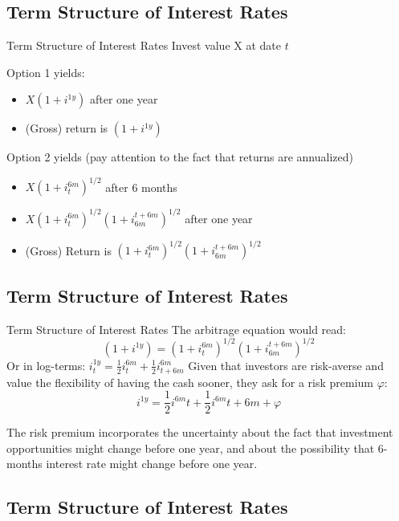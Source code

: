 \documentclass[
  ignorenonframetext,
  aspectratio=169,
]{beamer}
\providecommand{\tightlist}{%
  \setlength{\itemsep}{0pt}\setlength{\parskip}{0pt}}\usepackage{longtable,booktabs,array}
\begin{document}
\subsection{Term Structure of Interest
Rates}\label{term-structure-of-interest-rates}

\begin{frame}{Term Structure of Interest Rates}
Invest value X at date \(t\)

Option 1 yields:

\begin{itemize}
\tightlist
\item
  \(X(1+i^{1y})\) after one year
\item
  (Gross) return is \((1+i^{1y})\)
\end{itemize}

Option 2 yields (pay attention to the fact that returns are annualized)

\begin{itemize}
\tightlist
\item
  \(X(1+i^{6m}_t)^{1/2}\) after 6 months
\item
  \(X(1+i^{6m}_t)^{1/2}(1+i^{t+6m}_{6m})^{1/2}\) after one year
\item
  (Gross) Return is \((1+i^{6m}_t)^{1/2}(1+i^{t+6m}_{6m})^{1/2}\)
\end{itemize}
\end{frame}

\subsection{Term Structure of Interest
Rates}\label{term-structure-of-interest-rates-1}

\begin{frame}{Term Structure of Interest Rates}
The arbitrage equation would read:
\[(1+i^{1y}) = (1+i^{6m}_t)^{1/2}(1+i^{t+6m}_{6m})^{1/2}\] Or in
log-terms:
\(i^{1y}_t = \frac{1}{2} i^ {6m}_t + \frac{1}{2} i^ {6m}_{t+6m}\) Given
that investors are risk-averse and value the flexibility of having the
cash sooner, they ask for a risk premium \(\varphi\):
\[i^{1y} = \frac{1}{2} i^{6m}{t} + \frac{1}{2} i^ {6m}{t+6m} + \varphi\]

The risk premium incorporates the uncertainty about the fact that
investment opportunities might change before one year, and about the
possibility that 6-months interest rate might change before one year.
\end{frame}

\subsection{Term Structure of Interest
Rates}\label{term-structure-of-interest-rates-2}
\end{document}
